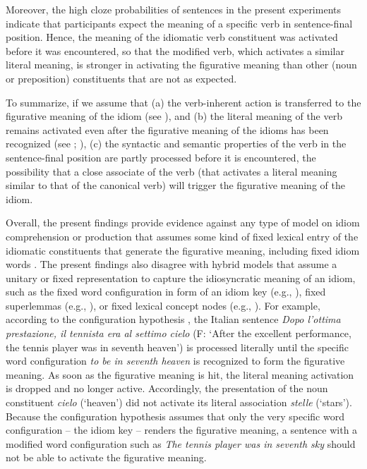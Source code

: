 \documentclass[output=paper]{langsci/langscibook}
\begin{document}
Moreover, the high cloze probabilities of sentences in the present experiments indicate that participants expect the meaning of a specific verb in sentence-final position. Hence, the meaning of the idiomatic verb constituent was activated before it was encountered, so that the modified verb, which activates a similar literal meaning, is stronger in activating the figurative meaning than other (noun or preposition) constituents that are not as expected. 


To summarize, if we assume that (a) the verb-inherent action is transferred to the figurative meaning of the idiom (see \citealt{hamblin:1999}), and (b) the literal meaning of the verb remains activated even after the figurative meaning of the idioms has been recognized (see \citealt{rabanus:2008}; \citealt{smolka:2007}), (c) the syntactic and semantic properties of the verb in the sentence-final position are partly processed before it is encountered, the possibility that a close associate of the verb (that activates a literal meaning similar to that of the canonical verb) will trigger the figurative meaning of the idiom.  


Overall, the present findings provide evidence against any type of model on idiom comprehension or production that assumes some kind of fixed lexical entry of the idiomatic constituents that generate the figurative meaning, including fixed idiom words \citep{bobrow:1973}. The present findings also disagree with hybrid models that assume a unitary or fixed representation to capture the idiosyncratic meaning of an idiom, such as the fixed word configuration in form of an idiom key (e.g., \citealt{cacciari:1988}), fixed superlemmas (e.g., \citealt{sprenger:2006}), or fixed lexical concept nodes (e.g., \citealt{cutting:1997}). For example, according to the configuration hypothesis \citep{cacciari:1988}, the Italian sentence \textit{Dopo l’ottima prestazione, il tennista era al settimo cielo} (F: `After the excellent performance, the tennis player was in seventh heaven') is processed literally until the specific word configuration \textit{to be in seventh heaven} is recognized to form the figurative meaning. As soon as the figurative meaning is hit, the literal meaning activation is dropped and no longer active. Accordingly, the presentation of the noun constituent \textit{cielo} (‘heaven’) did not activate its literal association \textit{stelle} (‘stars’). Because the configuration hypothesis assumes that only the very specific word configuration -- the idiom key -- renders the figurative meaning, a sentence with a modified word configuration such as \textit{The tennis player was in seventh sky} should not be able to activate the figurative meaning. 
\end{document}
